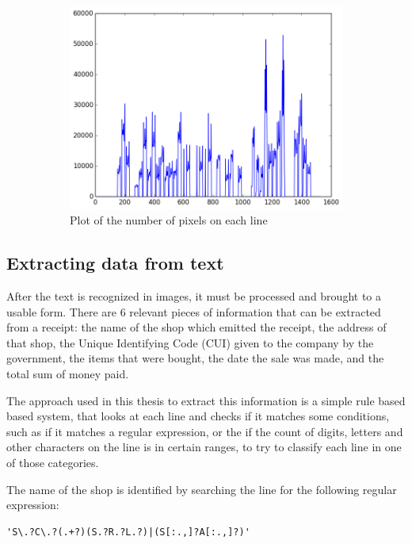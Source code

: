 \begin{figure}
\ContinuedFloat
\centering
\begin{subfigure}{\linewidth}
  \centering
  \includegraphics[width=\linewidth]{img/lines.png}
  \caption{Plot of the number of pixels on each line}
  \label{fig:line_plot}
\end{subfigure}
\caption{\label{fig:plots2} }
\end{figure}

\subsection{Extracting data from text}
After the text is recognized in images, it must be processed and brought to a usable form. There are 6 relevant pieces of information that can be extracted from a receipt: the name of the shop which emitted the receipt, the address of that shop, the Unique Identifying Code (CUI) given to the company by the government, the items that were bought, the date the sale was made, and the total sum of money paid. 

The approach used in this thesis to extract this information is a simple rule based based system, that looks at each line and checks if it matches some conditions, such as if it matches a regular expression, or the if the count of digits, letters and other characters on the line is in certain ranges, to try to classify each line in one of those categories. 

The name of the shop is identified by searching the line for the following regular expression: 

\begin{lstlisting}
'S\.?C\.?(.+?)(S.?R.?L.?)|(S[:.,]?A[:.,]?)'
\end{lstlisting}


